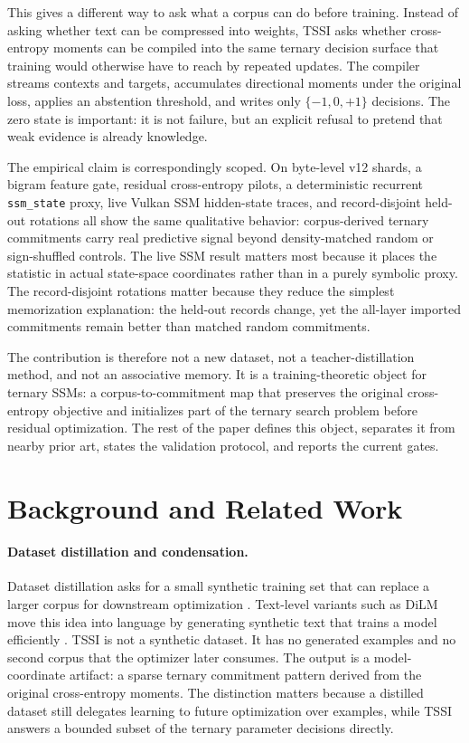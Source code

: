\documentclass{article}
\begin{document}
This gives a different way to ask what a corpus can do before training. Instead
of asking whether text can be compressed into weights, TSSI asks whether
cross-entropy moments can be compiled into the same ternary decision surface
that training would otherwise have to reach by repeated updates. The compiler
streams contexts and targets, accumulates directional moments under the
original loss, applies an abstention threshold, and writes only
$\{-1,0,+1\}$ decisions. The zero state is important: it is not failure, but an
explicit refusal to pretend that weak evidence is already knowledge.

The empirical claim is correspondingly scoped. On byte-level v12 shards, a
bigram feature gate, residual cross-entropy pilots, a deterministic recurrent
\texttt{ssm\_state} proxy, live Vulkan SSM hidden-state traces, and
record-disjoint held-out rotations all show the same qualitative behavior:
corpus-derived ternary commitments carry real predictive signal beyond
density-matched random or sign-shuffled controls. The live SSM result matters
most because it places the statistic in actual state-space coordinates rather
than in a purely symbolic proxy. The record-disjoint rotations matter because
they reduce the simplest memorization explanation: the held-out records change,
yet the all-layer imported commitments remain better than matched random
commitments.

The contribution is therefore not a new dataset, not a teacher-distillation
method, and not an associative memory. It is a training-theoretic object for
ternary SSMs: a corpus-to-commitment map that preserves the original
cross-entropy objective and initializes part of the ternary search problem
before residual optimization. The rest of the paper defines this object,
separates it from nearby prior art, states the validation protocol, and reports
the current gates.

\section{Background and Related Work}

\paragraph{Dataset distillation and condensation.}
Dataset distillation asks for a small synthetic training set that can replace a
larger corpus for downstream optimization \citep{wang2018datasetdistillation}.
Text-level variants such as DiLM move this idea into language by generating
synthetic text that trains a model efficiently \citep{dilm2024}. TSSI is not a
synthetic dataset. It has no generated examples and no second corpus that the
optimizer later consumes. The output is a model-coordinate artifact: a sparse
ternary commitment pattern derived from the original cross-entropy moments.
The distinction matters because a distilled dataset still delegates learning to
future optimization over examples, while TSSI answers a bounded subset of the
ternary parameter decisions directly.
\end{document}
